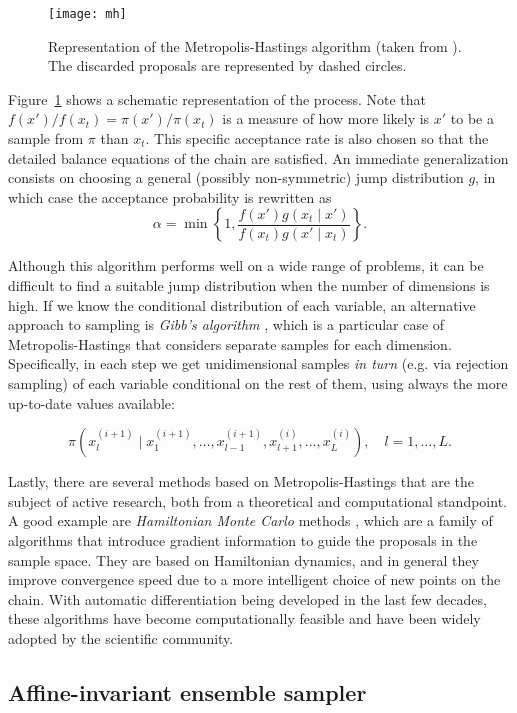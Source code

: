  \begin{figure}[ht!]
   \centering
   \texttt{[image: mh]}
   \caption{Representation of the Metropolis-Hastings algorithm (taken from \citet{jaewook2015metamodel}). The discarded proposals are represented by dashed circles.}\label{fig:mh}
 \end{figure}

Figure~\ref{fig:mh} shows a schematic representation of the process. Note that \(f(x')/f(x_t)=\pi(x')/\pi(x_t)\) is a measure of how more likely is \(x'\) to be a sample from \(\pi\) than \(x_t\). This specific acceptance rate is also chosen so that the detailed balance equations of the chain are satisfied. An immediate generalization consists on choosing a general (possibly non-symmetric) jump distribution \(g\), in which case the acceptance probability is rewritten as
\[
\alpha = \min\left\{1, \frac{f(x')g(x_t \mid x')}{f(x_t)g(x'\mid x_t)}\right\}.
\]

Although this algorithm performs well on a wide range of problems, it can be difficult to find a suitable jump distribution when the number of dimensions is high. If we know the conditional distribution of each variable, an alternative approach to sampling is \textit{Gibb's algorithm} \citep{geman1984stochastic}, which is a particular case of Metropolis-Hastings that considers separate samples for each dimension. Specifically, in each step we get unidimensional samples \textit{in turn} (e.g. via rejection sampling) of each variable conditional on the rest of them, using always the more up-to-date values available:

\[
\pi(x_l^{(i+1)} \mid x_{1}^{(i+1)}, \dots, x_{l-1}^{(i+1)}, x_{l+1}^{(i)}, \dots, x_L^{(i)}), \quad l=1,\dots,L.
\]

Lastly, there are several methods based on Metropolis-Hastings that are the subject of active research, both from a theoretical and computational standpoint. A good example are \textit{Hamiltonian Monte Carlo} methods \citep[e.g.][]{neal2011mcmc}, which are a family of algorithms that introduce gradient information to guide the proposals in the sample space. They are based on Hamiltonian dynamics, and in general they improve convergence speed due to a more intelligent choice of new points on the chain. With automatic differentiation being developed in the last few decades, these algorithms have become computationally feasible and have been widely adopted by the scientific community.

\subsection*{Affine-invariant ensemble sampler}

